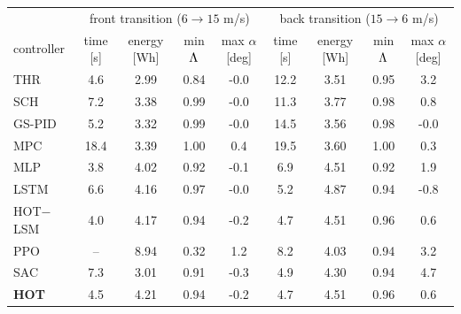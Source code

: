 \begin{tabular}{l|cccc|cccc}\toprule
& \multicolumn{4}{c|}{front transition ($6\to15$ m/s)} & \multicolumn{4}{c}{back transition ($15\to6$ m/s)}\\
controller & time [s] & energy [Wh] & min $\Lambda$ & max $\alpha$ [deg] & time [s] & energy [Wh] & min $\Lambda$ & max $\alpha$ [deg]\\\midrule
THR & 4.6 & 2.99 & 0.84 & -0.0 & 12.2 & 3.51 & 0.95 & 3.2\\
SCH & 7.2 & 3.38 & 0.99 & -0.0 & 11.3 & 3.77 & 0.98 & 0.8\\
GS-PID & 5.2 & 3.32 & 0.99 & -0.0 & 14.5 & 3.56 & 0.98 & -0.0\\
MPC & 18.4 & 3.39 & 1.00 & 0.4 & 19.5 & 3.60 & 1.00 & 0.3\\
MLP & 3.8 & 4.02 & 0.92 & -0.1 & 6.9 & 4.51 & 0.92 & 1.9\\
LSTM & 6.6 & 4.16 & 0.97 & -0.0 & 5.2 & 4.87 & 0.94 & -0.8\\
HOT$-$LSM & 4.0 & 4.17 & 0.94 & -0.2 & 4.7 & 4.51 & 0.96 & 0.6\\
PPO & -- & 8.94 & 0.32 & 1.2 & 8.2 & 4.03 & 0.94 & 3.2\\
SAC & 7.3 & 3.01 & 0.91 & -0.3 & 4.9 & 4.30 & 0.94 & 4.7\\
\textbf{HOT} & 4.5 & 4.21 & 0.94 & -0.2 & 4.7 & 4.51 & 0.96 & 0.6\\
\bottomrule\end{tabular}